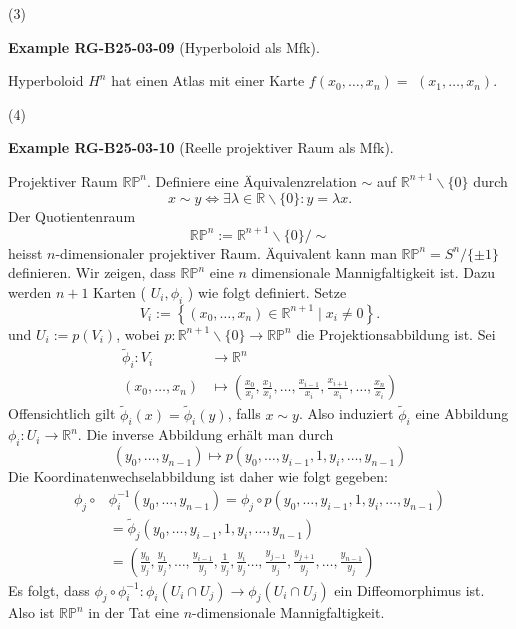 \documentclass[10pt, letterpaper]{article}
\newcommand{\CustomHeading}[3]{%
  \par\medskip\noindent%
  \textbf{#1 #2} \textnormal{(#3)}.\enskip%
}
\newenvironment{EXA}[2]{\begin{unitbox}\CustomHeading{Example}{#1}{#2}}{\end{unitbox}}
\begin{document}
(3) 

\begin{EXA}{RG-B25-03-09}{Hyperboloid als Mfk}
Hyperboloid $H^{n}$ hat einen Atlas mit einer Karte $f\left(x_{0}, \ldots, x_{n}\right)=$ $\left(x_{1}, \ldots, x_{n}\right)$.
\end{EXA}


(4) 

\begin{EXA}{RG-B25-03-10}{Reelle projektiver Raum als Mfk}
Projektiver Raum $\mathbb{R P}^{n}$. Definiere eine Äquivalenzrelation $\sim$ auf $\mathbb{R}^{n+1} \backslash\{0\}$ durch
$$
x \sim y \Longleftrightarrow \exists \lambda \in \mathbb{R} \backslash\{0\}: y=\lambda x .
$$
Der Quotientenraum
$$
\mathbb{R P}^{n}:=\mathbb{R}^{n+1} \backslash\{0\} / \sim
$$
heisst $n$-dimensionaler projektiver Raum. Äquivalent kann man $\mathbb{R} \mathbb{P}^{n}=S^{n} /\{ \pm 1\}$ definieren. Wir zeigen, dass $\mathbb{R} \mathbb{P}^{n}$ eine $n$ dimensionale Mannigfaltigkeit ist. Dazu werden $n+1$ Karten ( $U_{i}, \phi_{i}$ ) wie folgt definiert. Setze
$$
V_{i}:=\left\{\left(x_{0}, \ldots, x_{n}\right) \in \mathbb{R}^{n+1} \mid x_{i} \neq 0\right\} .
$$
und $U_{i}:=p\left(V_{i}\right)$, wobei $p: \mathbb{R}^{n+1} \backslash\{0\} \rightarrow \mathbb{R} \mathbb{P}^{n}$ die Projektionsabbildung ist. Sei
$$
\begin{aligned}
\tilde{\phi}_{i}: V_{i} & \rightarrow \mathbb{R}^{n} \\
\left(x_{0}, \ldots, x_{n}\right) & \mapsto\left(\frac{x_{0}}{x_{i}}, \frac{x_{1}}{x_{i}}, \ldots, \frac{x_{i-1}}{x_{i}}, \frac{x_{i+1}}{x_{i}}, \ldots, \frac{x_{n}}{x_{i}}\right)
\end{aligned}
$$
Offensichtlich gilt $\tilde{\phi}_{i}(x)=\tilde{\phi}_{i}(y)$, falls $x \sim y$. Also induziert $\tilde{\phi}_{i}$ eine Abbildung $\phi_{i}: U_{i} \rightarrow \mathbb{R}^{n}$. Die inverse Abbildung erhält man durch
$$
\left(y_{0}, \ldots, y_{n-1}\right) \mapsto p\left(y_{0}, \ldots, y_{i-1}, 1, y_{i}, \ldots, y_{n-1}\right)
$$
Die Koordinatenwechselabbildung ist daher wie folgt gegeben:
$$
\begin{aligned}
\phi_{j} \circ & \phi_{i}^{-1}\left(y_{0}, \ldots, y_{n-1}\right)=\phi_{j} \circ p\left(y_{0}, \ldots, y_{i-1}, 1, y_{i}, \ldots, y_{n-1}\right) \\
& =\tilde{\phi}_{j}\left(y_{0}, \ldots, y_{i-1}, 1, y_{i}, \ldots, y_{n-1}\right) \\
& =\left(\frac{y_{0}}{y_{j}}, \frac{y_{1}}{y_{j}}, \ldots, \frac{y_{i-1}}{y_{j}}, \frac{1}{y_{j}}, \frac{y_{i}}{y_{j}} \ldots, \frac{y_{j-1}}{y_{j}}, \frac{y_{j+1}}{y_{j}}, \ldots, \frac{y_{n-1}}{y_{j}}\right)
\end{aligned}
$$
Es folgt, dass $\phi_{j} \circ \phi_{i}^{-1}: \phi_{i}\left(U_{i} \cap U_{j}\right) \rightarrow \phi_{j}\left(U_{i} \cap U_{j}\right)$ ein Diffeomorphimus ist. Also ist $\mathbb{R P}^{n}$ in der Tat eine $n$-dimensionale Mannigfaltigkeit.
\end{EXA}
\end{document}
